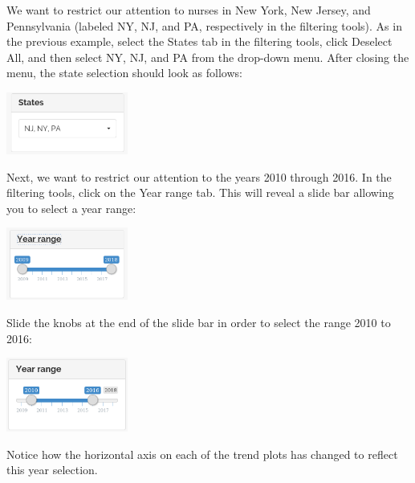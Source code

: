 \documentclass[letterpaper,12pt]{article}
\begin{document}
\begin{enumerate}
  We want to restrict our attention to nurses in New York, New Jersey,
  and Pennsylvania (labeled NY, NJ, and PA, respectively in the
  filtering tools). As in the previous example, select the States tab
  in the filtering tools, click Deselect All, and then select NY, NJ,
  and PA from the drop-down menu. After closing the menu, the state
  selection should look as follows:
  \begin{center}
    \includegraphics[width=0.3\textwidth]{images/trends_ex3/state_selection.png}
  \end{center}
  Next, we want to restrict our attention to the years 2010 through
  2016. In the filtering tools, click on the Year range tab. This will
  reveal a slide bar allowing you to select a year range:
  \begin{center}
    \includegraphics[width=0.3\textwidth]{images/trends_ex3/year_selection.png}
  \end{center}
  Slide the knobs at the end of the slide bar in order to select the
  range 2010 to 2016:
  \begin{center}
    \includegraphics[width=0.3\textwidth]{images/trends_ex3/year_selection2.png}
  \end{center}
  Notice how the horizontal axis on each of the trend plots has
  changed to reflect this year selection.


\end{enumerate}
\end{document}
